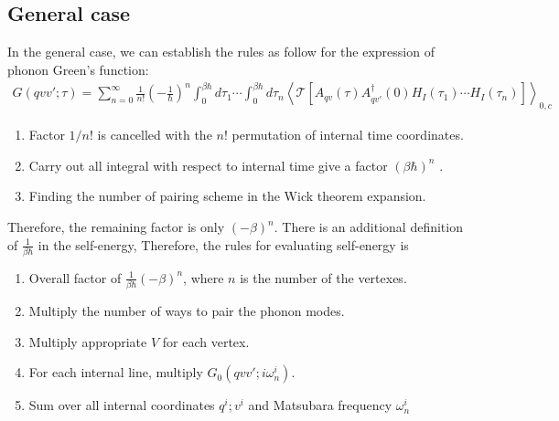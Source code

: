 \documentclass{article}
\begin{document}
\subsection*{General case}
In the general case, we can establish the rules as follow for the expression of phonon Green's function:
\begin{align}
    G(qvv';\tau)= \sum_{n=0}^{\infty} \frac{1}{n!} \left( -\frac{1}{\hbar} \right)^{n} 
    \int_0^{\beta\hbar} d\tau_1 \cdots \int_0^{\beta\hbar} d\tau_{n} \left\langle \mathcal{T}[ A_{qv}(\tau) A_{qv'}^{\dagger}(0) H_I(\tau_1) \cdots H_I(\tau_{n}) ] \right\rangle_{0,c} 
\end{align}
\begin{enumerate}
    \item Factor $1/n!$ is cancelled with the $n!$ permutation of internal time coordinates.
    \item Carry out all integral with respect to internal time give a factor $(\beta\hbar)^n$ .
    \item Finding the number of pairing scheme in the Wick theorem expansion.
\end{enumerate}
Therefore, the remaining factor is only $(-\beta)^n$. There is an additional definition of 
$\frac{1}{\beta\hbar}$ in the self-energy, Therefore, the rules for evaluating self-energy 
is 
\begin{enumerate}
    \item Overall factor of $\frac{1}{\beta\hbar} (-\beta)^n$, where $n$ is the number of the vertexes.
    \item Multiply the number of ways to pair the phonon modes.
    \item Multiply appropriate $V$ for each vertex.
    \item For each internal line, multiply $G_0(qvv';i\omega^i_n)$.
    \item Sum over all internal coordinates $q^i;v^i$ and Matsubara frequency $\omega_n^i$
\end{enumerate}
\end{document}
